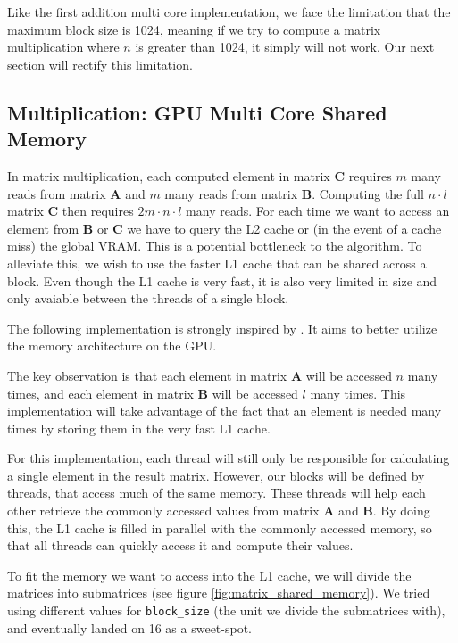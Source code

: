 Like the first addition multi core implementation, we face the limitation that the maximum block size is 1024, meaning if we try to compute a matrix multiplication where $n$ is greater than 1024, it simply will not work. Our next section will rectify this limitation.

\subsection{Multiplication: GPU Multi Core Shared Memory}


In matrix multiplication, each computed element in matrix $\mathbf{C}$ requires $m$ many reads from matrix $\mathbf{A}$ and $m$ many reads from matrix $\mathbf{B}$. Computing the full ${n \cdot l}$ matrix $\mathbf{C}$ then requires $2m \cdot n \cdot l$ many reads. For each time we want to access an element from $\mathbf{B}$ or $\mathbf{C}$ we have to query the L2 cache or (in the event of a cache miss) the global VRAM. This is a potential bottleneck to the algorithm. To alleviate this, we wish to use the faster L1 cache that can be shared across a block. Even though the L1 cache is very fast, it is also very limited in size and only avaiable between the threads of a single block. 

The following implementation is strongly inspired by \cite[Sect. 3.2.4]{nvidia:cudadoc}. It aims to better utilize the memory architecture on the GPU. 

The key observation is that each element in matrix $\mathbf{A}$ will be accessed $n$ many times, and each element in matrix $\mathbf{B}$ will be accessed $l$ many times. This implementation will take advantage of the fact that an element is needed many times by storing them in the very fast L1 cache. 

For this implementation, each thread will still only be responsible for calculating a single element in the result matrix. However, our blocks will be defined by threads, that access much of the same memory. These threads will help each other retrieve the commonly accessed values from matrix $\mathbf{A}$ and $\mathbf{B}$. By doing this, the L1 cache is filled in parallel with the commonly accessed memory, so that all threads can quickly access it and compute their values. 

To fit the memory we want to access into the L1 cache, we will divide the matrices into submatrices (see figure \ref{fig:matrix_shared_memory}). We tried using different values for \texttt{block\_size} (the unit we divide the submatrices with), and eventually landed on 16 as a sweet-spot.

